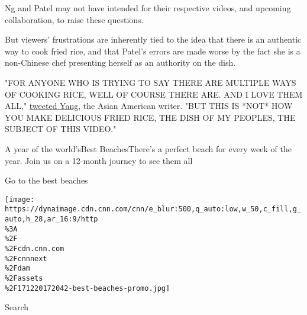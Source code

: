 Ng and Patel may not have intended for their respective videos, and
upcoming collaboration, to raise these questions.

But viewers' frustrations are inherently tied to the idea that there is
an authentic way to cook fried rice, and that Patel's errors are made
worse by the fact she is a non-Chinese chef presenting herself as an
authority on the dish.

"FOR ANYONE WHO IS TRYING TO SAY THERE ARE MULTIPLE WAYS OF COOKING
RICE, WELL OF COURSE THERE ARE. AND I LOVE THEM ALL,"
\href{https://twitter.com/jennyyangtv/status/1286351923407396864}{tweeted
Yang,} the Asian American writer. "BUT THIS IS *NOT* HOW YOU MAKE
DELICIOUS FRIED RICE, THE DISH OF MY PEOPLES, THE SUBJECT OF THIS
VIDEO."

\href{//www.cnn.com/interactive/travel/best-beaches}{}

A year of the world'sBest BeachesThere's a perfect beach for every week
of the year. Join us on a 12-month journey to see them all

Go to the best beaches

\texttt{[image: https://dynaimage.cdn.cnn.com/cnn/e\_blur:500,q\_auto:low,w\_50,c\_fill,g\_auto,h\_28,ar\_16:9/http\\\%3A\\\%2F\\\%2Fcdn.cnn.com\\\%2Fcnnnext\\\%2Fdam\\\%2Fassets\\\%2F171220172042-best-beaches-promo.jpg]}

Search

